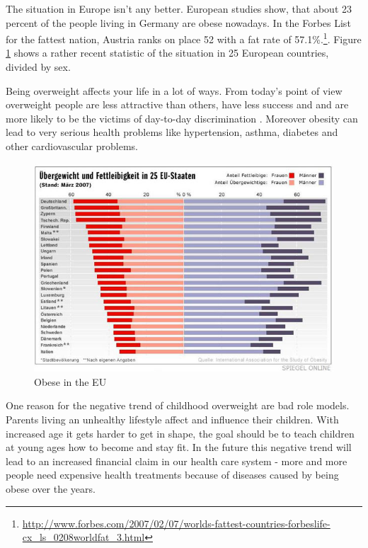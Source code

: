 \documentclass[a4paper,11pt]{article}
\begin{document}
The situation in Europe isn't any better. European studies\citep{rki2012} show, that about 23 percent of the people living in Germany are obese nowadays. In the Forbes List for the fattest nation, Austria ranks on place 52 with a fat rate of 57.1\%.\footnote{\url{http://www.forbes.com/2007/02/07/worlds-fattest-countries-forbeslife-cx_ls_0208worldfat_3.html}}. Figure \ref{fig:obese_in_eu_pdf} shows a rather recent statistic of the situation in 25 European countries, divided by sex. 

Being overweight affects your life in a lot of ways. From today's point of view overweight people are less attractive than others, have less success and and are more likely to be the victims of day-to-day discrimination \citep{carr05}. Moreover obesity can lead to very serious health problems like hypertension, asthma, diabetes and other cardiovascular problems.  \\

\begin{figure}[tb]
	\centering
	\includegraphics[width=1\textwidth]{images/introduction/1.jpg}
	\caption{Obese in the EU}
	\label{fig:obese_in_eu_pdf}
\end{figure}

One reason for the negative trend of childhood overweight are bad role models. Parents living an unhealthy lifestyle affect and influence their children. With increased age it gets harder to get in shape, the goal should be to teach children at young ages how to become and stay fit. In the future this negative trend will lead to an increased financial claim in our health care system - more and more people need expensive health treatments because of diseases caused by being obese over the years.  \\
\end{document}
